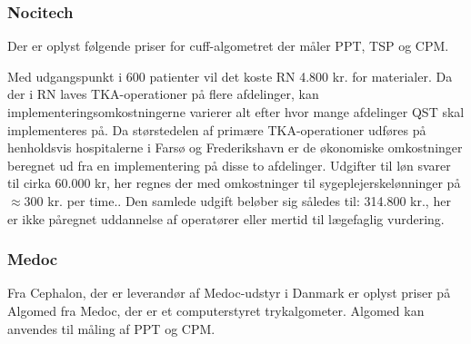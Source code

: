 \subsubsection{Nocitech}
Der er oplyst følgende priser for cuff-algometret der måler PPT, TSP og CPM.

Med udgangspunkt i 600 patienter vil det koste RN 4.800 kr. for materialer. Da der i RN laves TKA-operationer på flere afdelinger, kan implementeringsomkostningerne varierer alt efter hvor mange afdelinger QST skal implementeres på. Da størstedelen af primære TKA-operationer udføres på henholdsvis hospitalerne i Farsø og Frederikshavn er de økonomiske omkostninger beregnet ud fra en implementering på disse to afdelinger. Udgifter til løn svarer til cirka 60.000 kr, her regnes der med omkostninger til sygeplejerskelønninger på $\approx 300$ kr. per time.\citep{DST1}\citep{DTS2}. Den samlede udgift beløber sig således til: 314.800 kr., her er ikke påregnet uddannelse af operatører eller mertid til lægefaglig vurdering.

\subsubsection{Medoc}
Fra Cephalon, der er leverandør af Medoc-udstyr i Danmark er oplyst priser på Algomed fra Medoc, der er et computerstyret trykalgometer. Algomed kan anvendes til måling af PPT og CPM. \citep{AlgomedOnline} \citep{AlgomedData}


